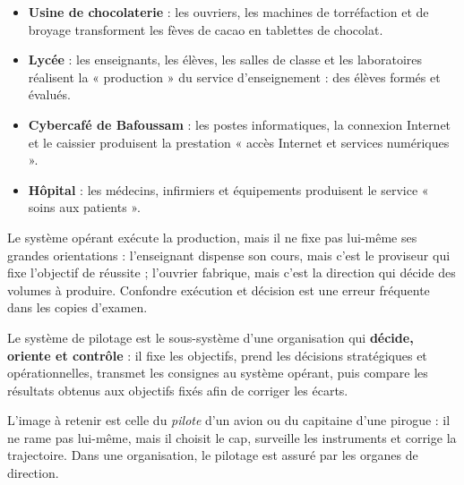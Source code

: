 \documentclass[11pt]{article}
\newcommand{\cle}[1]{{\popxbold\color{popdark}#1}}
\newcounter{popsec}
\newcounter{popsub}
\newcommand{\courssub}[1]{%
  \stepcounter{popsub}%
  \par\vspace{9pt}\noindent{\popxbold\fontsize{11.5}{13}\selectfont\color{popink}{\color{poporange}\thepopsec.\thepopsub}\hspace{6pt}#1}\par\nopagebreak\vspace{4pt}
}
\begin{document}
\begin{exemplebox}
\begin{itemize}
\item \textbf{Usine de chocolaterie} : les ouvriers, les machines de torréfaction et de broyage transforment les fèves de cacao en tablettes de chocolat.
\item \textbf{Lycée} : les enseignants, les élèves, les salles de classe et les laboratoires réalisent la « production » du service d'enseignement : des élèves formés et évalués.
\item \textbf{Cybercafé de Bafoussam} : les postes informatiques, la connexion Internet et le caissier produisent la prestation « accès Internet et services numériques ».
\item \textbf{Hôpital} : les médecins, infirmiers et équipements produisent le service « soins aux patients ».
\end{itemize}
\end{exemplebox}

\begin{attention}
Le système opérant exécute la production, mais il ne fixe pas lui-même ses grandes orientations : l'enseignant dispense son cours, mais c'est le proviseur qui fixe l'objectif de réussite ; l'ouvrier fabrique, mais c'est la direction qui décide des volumes à produire. Confondre exécution et décision est une erreur fréquente dans les copies d'examen.
\end{attention}

\courssub{Le système de pilotage}

\begin{definition}
Le \cle{système de pilotage} est le sous-système d'une organisation qui \textbf{décide, oriente et contrôle} : il fixe les objectifs, prend les décisions stratégiques et opérationnelles, transmet les consignes au système opérant, puis compare les résultats obtenus aux objectifs fixés afin de corriger les écarts.
\end{definition}

L'image à retenir est celle du \emph{pilote} d'un avion ou du capitaine d'une pirogue : il ne rame pas lui-même, mais il choisit le cap, surveille les instruments et corrige la trajectoire. Dans une organisation, le pilotage est assuré par les organes de direction.
\end{document}
